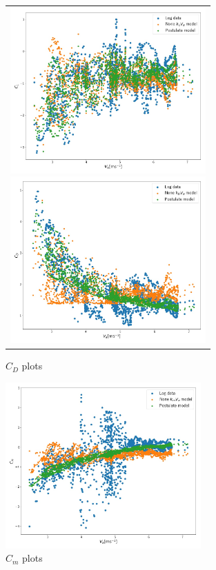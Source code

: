 \begin{figure}[htbp]
	\begin{center}
		\begin{tabular}{c}
			\begin{minipage}{0.5\hsize}
				\begin{center}
					\includegraphics[clip,width=7.5cm,bb=0 0 982 835]{./z_figure_files/chapter5/2_CL.jpeg}
					\caption{$C_L$ plots}
					\label{fig:CL_si}
				\end{center}
			\end{minipage}
			\begin{minipage}{0.5\hsize}
				\begin{center}
					\includegraphics[clip,width=7.5cm,bb=0 0 982 835]{./z_figure_files/chapter5/3_CD.jpeg}
					\caption{$C_D$ plots}
					\label{fig:CD_si}
				\end{center}
			\end{minipage}
		\end{tabular}
	\end{center}
\end{figure}
\begin{figure}[H]
  \begin{center}
    \includegraphics[clip,width=7.5cm,bb=0 0 982 835]{./z_figure_files/chapter5/4_Cm.jpeg}
    \caption{$C_m$ plots}
    \label{fig:Cm_si}
  \end{center}
\end{figure}


